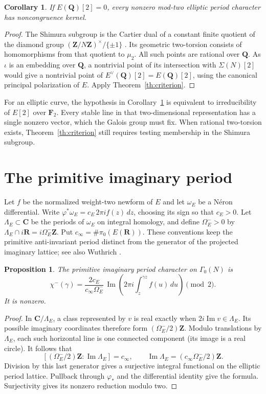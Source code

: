 \documentclass[11pt]{article}
\newtheorem{corollary}[theorem]{Corollary}
\newtheorem{proposition}[theorem]{Proposition}
\newcommand{\Z}{\mathbf Z}
\newcommand{\Q}{\mathbf Q}
\newcommand{\C}{\mathbf C}
\newcommand{\R}{\mathbf R}
\newcommand{\F}{\mathbf F}
\begin{document}
\begin{corollary}\label{cor:no2}
If \(E(\Q)[2]=0\), every nonzero mod-two elliptic period character
has noncongruence kernel.
\end{corollary}
\begin{proof}
The Shimura subgroup is the Cartier dual of a constant finite quotient
of the diamond group
\((\Z/N\Z)^\times/\{\pm1\}\) \cite{LO,Rib}. Its geometric two-torsion
consists of homomorphisms from that quotient to \(\mu_2\). All such
points are rational over \(\Q\). As \(\iota\) is an embedding over \(\Q\),
a nontrivial point of its intersection with \(\Sigma(N)[2]\) would give a
nontrivial point of \(E^\vee(\Q)[2]=E(\Q)[2]\), using the canonical
principal polarization of \(E\). Apply Theorem~\ref{th:criterion}.
\end{proof}

For an elliptic curve, the hypothesis in Corollary~\ref{cor:no2} is
equivalent to irreducibility of \(E[2]\) over \(\F_2\). Every stable line
in that two-dimensional representation has a single nonzero vector,
which the Galois group must fix. When rational two-torsion exists,
Theorem~\ref{th:criterion} still requires testing membership in the
Shimura subgroup.

\section{The primitive imaginary period}

Let \(f\) be the normalized weight-two newform of \(E\) and let
\(\omega_E\) be a N\'eron differential. Write
\(\varphi^*\omega_E=c_E\,2\pi i f(z)\,dz\), choosing its sign so that
\(c_E>0\). Let \(\Lambda_E\subset\C\) be the periods of \(\omega_E\)
on integral homology, and define \(\Omega_E^->0\) by
\(\Lambda_E\cap i\R=i\Omega_E^-\Z\). Put
\(c_\infty=\#\pi_0(E(\R))\). These conventions keep the primitive
anti-invariant period distinct from the generator of the projected
imaginary lattice; see also Wuthrich \cite{Wut}.

\begin{proposition}
The primitive imaginary period character on \(\Gamma_0(N)\) is
\[
 \chi^-(\gamma)=
 \frac{2c_E}{c_\infty\Omega_E^-}\,
 \operatorname{Im}\!\left(2\pi i\int_z^{\gamma z} f(u)\,du\right)
 \pmod 2 .
\]
It is nonzero.
\end{proposition}

\begin{proof}
In \(\C/\Lambda_E\), a class represented by \(v\) is real exactly when
\(2i\operatorname{Im}v\in\Lambda_E\).
Its possible imaginary coordinates therefore form
\((\Omega_E^-/2)\Z\). Modulo translations by \(\Lambda_E\), each such
horizontal line is one connected component (its image is a real circle).
It follows that
\[
 [(\Omega_E^-/2)\Z:\operatorname{Im}\Lambda_E]=c_\infty,
 \qquad
 \operatorname{Im}\Lambda_E=(c_\infty\Omega_E^-/2)\Z .
\]
Division by this last generator gives a surjective integral functional
on the elliptic period lattice. Pullback through \(\varphi_*\) and the
differential identity give the formula. Surjectivity gives its
nonzero reduction modulo two.
\end{proof}
\end{document}
